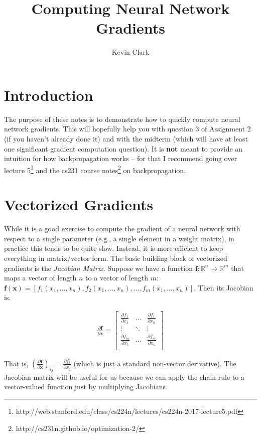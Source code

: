\documentclass{article}[11pt]
\title{Computing Neural Network Gradients}
\date{}
\author{Kevin Clark}
\newcommand{\bmf} { \bm{f} }
\newcommand{\bx} { \bm{x} }
\newcommand{\alns}[1] {
	\begin{align*} #1 \end{align*}
}
\newcommand{\pd}[2] {
 \frac{\partial #1}{\partial #2}
}
\begin{document}
\maketitle
\vspace{-5mm}


\section{Introduction}
The purpose of these notes is to demonstrate how to quickly compute neural network gradients. This will hopefully help you with question 3 of Assignment 2 (if you haven't already done it) and with the midterm (which will have at least one significant gradient computation question). It is \textbf{not} meant to provide an intuition for how backpropagation works -- for that I recommend going over lecture 5\footnote{http://web.stanford.edu/class/cs224n/lectures/cs224n-2017-lecture5.pdf} and the cs231 course notes\footnote{http://cs231n.github.io/optimization-2/} on backpropagation. 
\section{Vectorized Gradients}
While it is a good exercise to compute the gradient of a neural network with respect to a single parameter (e.g., a single element in a weight matrix), in practice this tends to be quite slow. Instead, it is more efficient to keep everything in matrix/vector form. The basic building block of vectorized gradients is the {\it Jacobian Matrix}. Suppose we have a function $\bmf: \mathbb{R}^n \to \mathbb{R}^m$ that maps a vector of length $n$ to a vector of length $m$: $\bmf(\bx) = [f_1(x_1, ..., x_n), f_2(x_1, ..., x_n), ..., f_m(x_1, ..., x_n)]$. Then its Jacobian is.

\alns{
	\pd{\bmf}{\bx} = \begin{bmatrix}
		\pd{f_1}{x_1}  &  \dots   & \pd{f_1}{x_n} \\
		\vdots             & \ddots  & \vdots            \\
		\pd{f_m}{x_1} & \dots    & \pd{f_m}{x_n}            \\
	\end{bmatrix}
}
That is, $( \pd{\bmf}{\bx} )_{ij} = \pd{f_i}{x_j}$ (which is just a standard non-vector derivative). The Jacobian matrix will be useful for us because we can apply the chain rule to a vector-valued function just by multiplying Jacobians. \\
\end{document}
